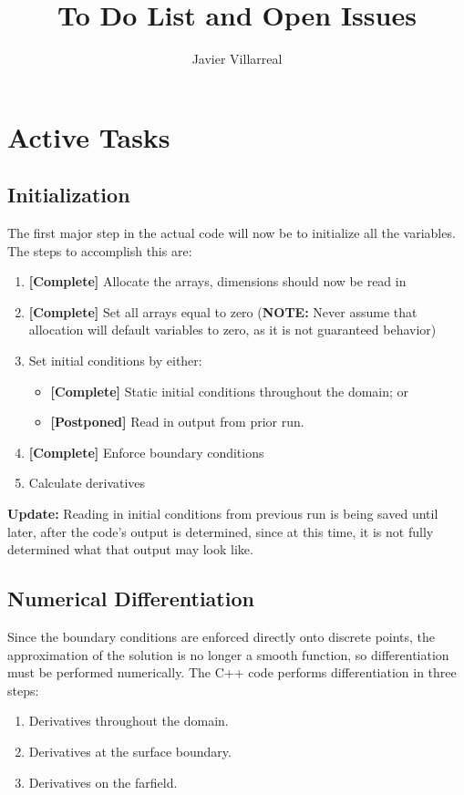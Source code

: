 \documentclass[12pt]{article}
\begin{document}
    \title{To Do List and Open Issues}
    \author{Javier Villarreal}
    \date{}
    \maketitle

    \section{Active Tasks}

    \subsection{Initialization}
    The first major step in the actual code will now be to initialize all the variables. The steps to accomplish this are:
    \begin{enumerate}
        \item \textbf{[Complete]} Allocate the arrays, dimensions should now be read in
        \item \textbf{[Complete]} Set all arrays equal to zero (\textbf{NOTE:} Never assume that allocation will default variables to zero, as it is not guaranteed behavior)
        \item Set initial conditions by either:
        \begin{itemize}
            \item \textbf{[Complete]} Static initial conditions throughout the domain; or
            \item \textbf{[Postponed]} Read in output from prior run.
        \end{itemize}
        \item \textbf{[Complete]} Enforce boundary conditions
        \item Calculate derivatives
    \end{enumerate}
    
    \textbf{Update:} Reading in initial conditions from previous run is being saved until later, after the code's output is determined, since at this time, it is not fully determined what that output may look like.

    \subsection{Numerical Differentiation}
    Since the boundary conditions are enforced directly onto discrete points, the approximation of the solution is no longer a smooth function, so differentiation must be performed numerically. The C++ code performs differentiation in three steps:
    \begin{enumerate}
        \item Derivatives throughout the domain.
        \item Derivatives at the surface boundary.
        \item Derivatives on the farfield.
    \end{enumerate}
\end{document}
